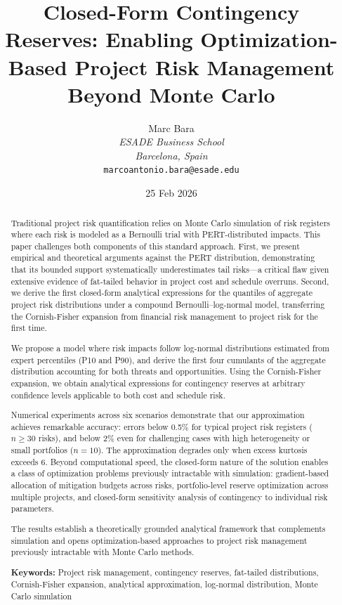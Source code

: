 \documentclass[12pt,a4paper]{article}
\title{Closed-Form Contingency Reserves: Enabling Optimization-Based Project Risk Management Beyond Monte Carlo}
\author{
Marc Bara\\
\textit{ESADE Business School}\\
\textit{Barcelona, Spain}\\
\texttt{marcoantonio.bara@esade.edu}
}
\date{25 Feb 2026}
\theoremstyle{definition}
\theoremstyle{remark}
\begin{document}
\maketitle

\begin{abstract}
Traditional project risk quantification relies on Monte Carlo simulation of risk registers where each risk is modeled as a Bernoulli trial with PERT-distributed impacts. This paper challenges both components of this standard approach. First, we present empirical and theoretical arguments against the PERT distribution, demonstrating that its bounded support systematically underestimates tail risks—a critical flaw given extensive evidence of fat-tailed behavior in project cost and schedule overruns. Second, we derive the first closed-form analytical expressions for the quantiles of aggregate project risk distributions under a compound Bernoulli--log-normal model, transferring the Cornish-Fisher expansion from financial risk management to project risk for the first time.

We propose a model where risk impacts follow log-normal distributions estimated from expert percentiles (P10 and P90), and derive the first four cumulants of the aggregate distribution accounting for both threats and opportunities. Using the Cornish-Fisher expansion, we obtain analytical expressions for contingency reserves at arbitrary confidence levels applicable to both cost and schedule risk.

Numerical experiments across six scenarios demonstrate that our approximation achieves remarkable accuracy: errors below 0.5\% for typical project risk registers ($n \geq 30$ risks), and below 2\% even for challenging cases with high heterogeneity or small portfolios ($n = 10$). The approximation degrades only when excess kurtosis exceeds 6. Beyond computational speed, the closed-form nature of the solution enables a class of optimization problems previously intractable with simulation: gradient-based allocation of mitigation budgets across risks, portfolio-level reserve optimization across multiple projects, and closed-form sensitivity analysis of contingency to individual risk parameters.

The results establish a theoretically grounded analytical framework that complements simulation and opens optimization-based approaches to project risk management previously intractable with Monte Carlo methods.

\medskip
\noindent\textbf{Keywords:} Project risk management, contingency reserves, fat-tailed distributions, Cornish-Fisher expansion, analytical approximation, log-normal distribution, Monte Carlo simulation
\end{abstract}
\end{document}
